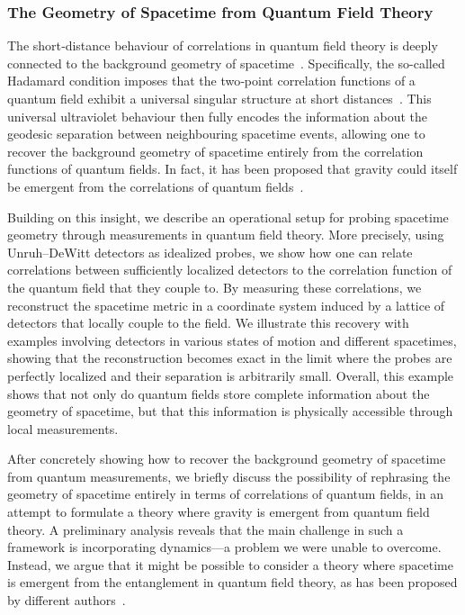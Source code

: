 \documentclass[letterpaper,12pt,titlepage,oneside,final]{book}
\begin{document}
\subsubsection*{The Geometry of Spacetime from Quantum Field Theory}


The short‐distance behaviour of correlations in quantum field theory is deeply connected to the background geometry of spacetime~\cite{achim}. Specifically, the so-called Hadamard condition imposes that the two‐point correlation functions of a quantum field exhibit a universal singular structure at short distances~\cite{geometry}. This universal ultraviolet behaviour then fully encodes the information about the geodesic separation between neighbouring spacetime events, allowing one to recover the background geometry of spacetime entirely from the correlation functions of quantum fields. In fact, it has been proposed that gravity could itself be emergent from the correlations of quantum fields~\cite{achim2}.

Building on this insight, we describe an operational setup for probing spacetime geometry through measurements in quantum field theory. More precisely, using Unruh–DeWitt detectors as idealized probes, we show how one can relate correlations between sufficiently localized detectors to the correlation function of the quantum field that they couple to. By measuring these correlations, we reconstruct the spacetime metric in a coordinate system induced by a lattice of detectors that locally couple to the field.  We illustrate this recovery with examples involving detectors in various states of motion and different spacetimes, showing that the reconstruction becomes exact in the limit where the probes are perfectly localized and their separation is arbitrarily small. Overall, this example shows that not only do quantum fields store complete information about the geometry of spacetime, but that this information is physically accessible through local measurements.


After concretely showing how to recover the background geometry of spacetime from quantum measurements, we briefly discuss the possibility of rephrasing the geometry of spacetime entirely in terms of correlations of quantum fields, in an attempt to formulate a theory where gravity is emergent from quantum field theory. A preliminary analysis reveals that the main challenge in such a framework is incorporating dynamics—a problem we were unable to overcome. Instead, we argue that it might be possible to consider a theory where spacetime is emergent from the entanglement in quantum field theory, as has been proposed by different authors~\cite{VanRaamsdonkEmergent2010,ADSCFTemergent,Cao1,Cao2,emergent2021,Gui2023}. 
\end{document}
